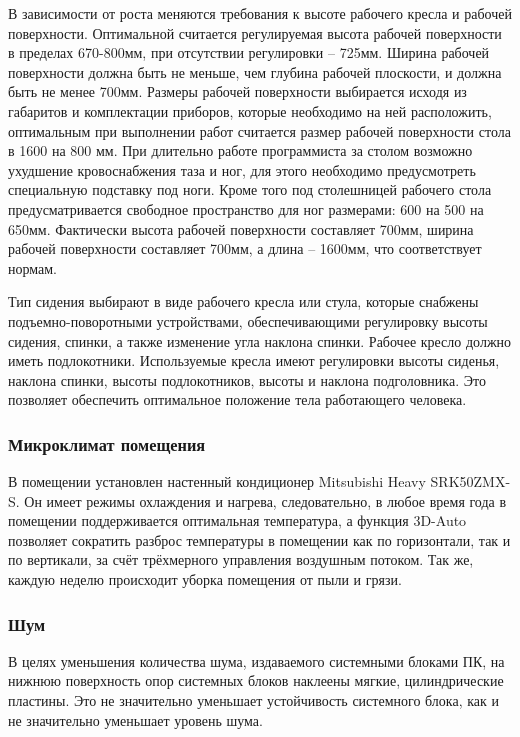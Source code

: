 В зависимости от роста меняются требования к высоте рабочего кресла и
рабочей поверхности. Оптимальной считается регулируемая высота рабочей
поверхности в пределах 670-800мм, при отсутствии регулировки -- 725мм.
Ширина рабочей поверхности должна быть не меньше, чем глубина рабочей плоскости,
и должна быть не менее 700мм. Размеры рабочей поверхности выбирается исходя из
габаритов и комплектации приборов, которые необходимо на ней расположить,
оптимальным при выполнении работ считается размер рабочей поверхности стола в
1600 на 800 мм. При длительно работе программиста за столом возможно ухудшение
кровоснабжения таза и ног, для этого необходимо предусмотреть специальную
подставку под ноги. Кроме того под столешницей рабочего стола предусматривается
свободное пространство для ног размерами: 600 на 500 на 650мм. Фактически высота
рабочей поверхности составляет 700мм, ширина рабочей поверхности составляет 700мм,
а длина – 1600мм, что соответствует нормам.

Тип сидения выбирают в виде рабочего кресла или стула, которые снабжены
подъемно-поворотными устройствами, обеспечивающими регулировку высоты сидения,
спинки, а также изменение угла наклона спинки. Рабочее кресло должно иметь
подлокотники. Используемые кресла имеют регулировки высоты сиденья, наклона спинки,
высоты подлокотников, высоты и наклона подголовника. Это позволяет обеспечить
оптимальное положение тела работающего человека.

\subsubsection{Микроклимат помещения}

В помещении установлен настенный кондиционер Mitsubishi Heavy SRK50ZMX-S.
Он имеет режимы охлаждения и нагрева, следовательно, в любое время года
в помещении поддерживается оптимальная температура, а функция 3D-Auto позволяет
сократить разброс температуры в помещении как по горизонтали, так и по вертикали,
за счёт трёхмерного управления воздушным потоком. Так же, каждую неделю
происходит уборка помещения от пыли и грязи.

\subsubsection{Шум}

В целях уменьшения количества шума, издаваемого системными блоками ПК, на нижнюю
поверхность опор системных блоков наклеены мягкие, цилиндрические пластины. Это
не значительно уменьшает устойчивость системного блока, как и не значительно уменьшает
уровень шума.

